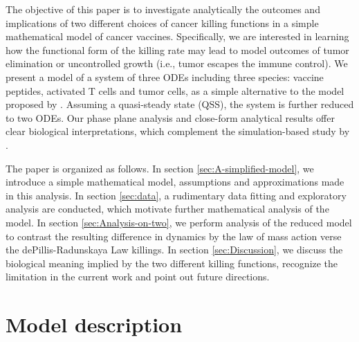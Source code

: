 \documentclass[review,authoryear]{elsarticle}
\begin{document}
The objective of this paper is to investigate analytically the outcomes
and implications of two different choices of cancer killing functions in a simple mathematical
model of cancer vaccines. Specifically, we are interested in learning
how the functional form of the killing rate may lead to model outcomes of tumor elimination
or uncontrolled growth (i.e., tumor escapes the immune control). We present
a model of a system of three ODEs
including three species: vaccine peptides, activated T cells and tumor
cells, as a simple alternative to the model proposed by \citet{Messan2021}. Assuming a quasi-steady state (QSS), the system is further reduced
to two ODEs. Our phase plane analysis and close-form analytical
results offer clear biological interpretations, which complement
the simulation-based study by \citet{Messan2021}. 

The paper is organized as follows. In section \ref{sec:A-simplified-model},
we introduce a simple mathematical model, assumptions and approximations made in this analysis. In section \ref{sec:data}, a rudimentary data fitting and exploratory analysis are conducted, which motivate further mathematical analysis of the model. In section \ref{sec:Analysis-on-two},
we perform analysis of the reduced model to contrast the resulting
difference in dynamics by the law of mass action verse the dePillis-Radunskaya
Law killings. In section \ref{sec:Discussion}, we discuss the biological
meaning implied by the two different killing functions, recognize the
limitation in the current work and point out future directions. 



\section{Model description \label{sec:A-simplified-model}}
\end{document}
